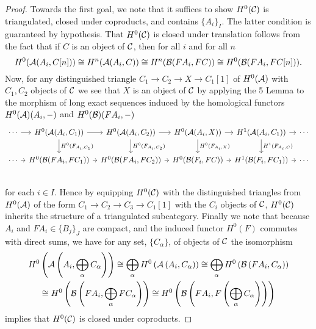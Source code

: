 \begin{proof}
  Towards the first goal, we note that it suffices to show \(H^0(\mathcal{C})\) is triangulated, closed under coproducts, and contains \(\{A_i\}_I\).
  The latter condition is guaranteed by hypothesis.
  That \(H^0(\mathcal{C})\) is closed under translation follows from the fact that if \(C\) is an object of \(\mathcal{C}\), then for all \(i\) and for all \(n\)
  \[H^0(\mathcal{A}(A_i, C[n])) \cong H^{n}(\mathcal{A}(A_i, C)) \cong H^{n}(\mathcal{B}(FA_i, FC)) \cong H^0(\mathcal{B}(FA_i, FC[n])).\]
  Now, for any distinguished triangle \(C_1 \to C_2 \to X \to C_1[1]\) of \(H^0(\mathcal{A})\) with \(C_1, C_2\) objects of \(\mathcal{C}\) we see that \(X\) is an object of \(\mathcal{C}\) by applying the 5 Lemma to the morphism of long exact sequences induced by the homological functors \(H^0(\mathcal{A})(A_i, -)\) and \(H^0(\mathcal{B})(FA_i, -)\)
  \[\begin{tikzcd}[column sep=tiny]
  \cdots \arrow{r} & H^0(\A(A_i, C_1)) \arrow{r}\arrow{d}{H^0(F_{A_i,C_1})} & H^0(\A(A_i, C_2)) \arrow{r}\arrow{d}{H^0(F_{A_i,C_2})} & H^0(\A(A_i, X)) \arrow{r}\arrow{d}{H^0(F_{A_i,X})} & H^1(\A(A_i, C_1)) \arrow{r}\arrow{d}{H^1(F_{A_i, C})} & \cdots\\
  \cdots \arrow{r} & H^0(\B(FA_i, FC_1)) \arrow{r} & H^0(\B(FA_i, FC_2)) \arrow{r} & H^0(\B(F_i, FC)) \arrow{r} & H^1(\B(F_i, FC_1)) \arrow{r}& \cdots\\
  \end{tikzcd}\]
  for each \(i \in I\).
  Hence by equipping \(H^0(\mathcal{C})\) with the distinguished triangles from \(H^0(\mathcal{A})\) of the form \(C_1 \to C_2 \to C_3 \to C_1[1]\) with the \(C_i\) objects of \(\mathcal{C}\), \(H^0(\mathcal{C})\) inherits the structure of a triangulated subcategory.
  Finally we note that because \(A_i\) and \(FA_i \in \{B_j\}_J\) are compact, and the induced functor \(H^0(F)\) commutes with direct sums, we have for any set, \(\{C_\alpha\}\), of objects of \(\mathcal{C}\) the isomorphism
  \begin{gather*}
    H^0\left(\mathcal{A}\left(A_i, \bigoplus_\alpha C_\alpha\right)\right) \cong \bigoplus_\alpha H^0\left(\mathcal{A}\left(A_i, C_\alpha\right)\right) \cong \bigoplus_\alpha H^0\left(\mathcal{B}\left(FA_i, C_\alpha\right)\right)\\
    \cong H^0\left(\mathcal{B}\left(FA_i, \bigoplus_\alpha FC_\alpha\right)\right) \cong H^0\left(\mathcal{B}\left(FA_i, F\left(\bigoplus_\alpha C_\alpha\right)\right)\right)
  \end{gather*}
  implies that \(H^0(\mathcal{C})\) is closed under coproducts.


\end{proof}
